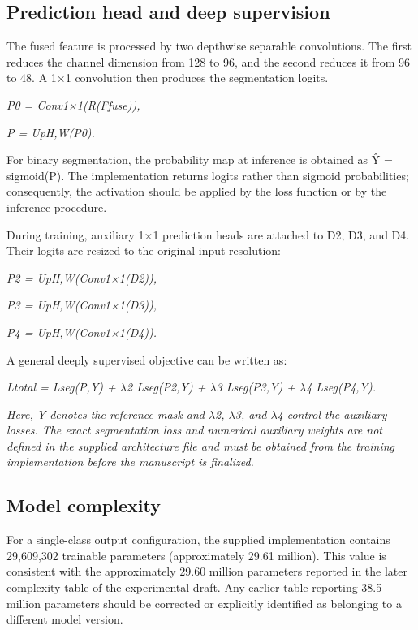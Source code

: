 \subsection{Prediction head and deep
supervision}\label{prediction-head-and-deep-supervision}

The fused feature is processed by two depthwise separable convolutions.
The first reduces the channel dimension from 128 to 96, and the second
reduces it from 96 to 48. A 1×1 convolution then produces the
segmentation logits.

\emph{P0 = Conv1×1(R(Ffuse)),}

\emph{P = UpH,W(P0).}

For binary segmentation, the probability map at inference is obtained as
Ŷ = sigmoid(P). The implementation returns logits rather than sigmoid
probabilities; consequently, the activation should be applied by the
loss function or by the inference procedure.

During training, auxiliary 1×1 prediction heads are attached to D2, D3,
and D4. Their logits are resized to the original input resolution:

\emph{P2 = UpH,W(Conv1×1(D2)),}

\emph{P3 = UpH,W(Conv1×1(D3)),}

\emph{P4 = UpH,W(Conv1×1(D4)).}

A general deeply supervised objective can be written as:

\emph{Ltotal = Lseg(P,Y) + $\lambda$2 Lseg(P2,Y) + $\lambda$3 Lseg(P3,Y) + $\lambda$4
Lseg(P4,Y).}

\emph{Here, Y denotes the reference mask and $\lambda$2, $\lambda$3, and $\lambda$4 control the
auxiliary losses. The exact segmentation loss and numerical auxiliary
weights are not defined in the supplied architecture file and must be
obtained from the training implementation before the manuscript is
finalized.}

\subsection{Model complexity}\label{model-complexity}

For a single-class output configuration, the supplied implementation
contains 29,609,302 trainable parameters (approximately 29.61 million).
This value is consistent with the approximately 29.60 million parameters
reported in the later complexity table of the experimental draft. Any
earlier table reporting 38.5 million parameters should be corrected or
explicitly identified as belonging to a different model version.

